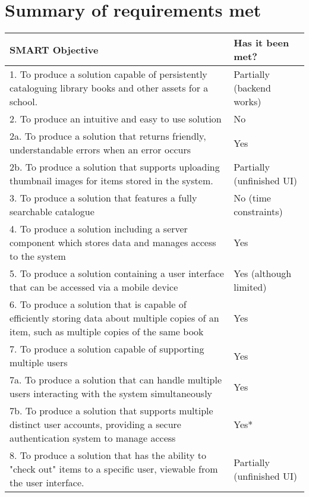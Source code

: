 \documentclass[../main.tex]{subfiles}
\begin{document}
\section{Summary of requirements met}

\begin{longtable}{ | >{\raggedright}p{} | >{\raggedright\arraybackslash}p{} | }
    \hline
    \textbf{SMART Objective}                                      & \textbf{Has it been met?} \\
    \hline
    1. To produce a solution capable of persistently
    cataloguing library books and other assets for a school.
                                                                  & Partially (backend works) \\
    \hline
    2. To produce an intuitive and easy to use solution
                                                                  & No                        \\
    \hline
    2a. To produce a solution that returns friendly, understandable errors when
    an error occurs                                               & Yes                       \\
    \hline
    2b. To produce a solution that supports uploading thumbnail images for items
    stored in the system.                                         & Partially (unfinished UI) \\
    \hline
    3. To produce a solution that features a fully searchable catalogue
                                                                  & No (time constraints)     \\
    \hline
    4. To produce a solution including a server component which stores data and
    manages access to the system                                  & Yes                       \\
    \hline
    5. To produce a solution containing a user interface that can be accessed via a
    mobile device                                                 & Yes (although limited)    \\
    \hline
    6. To produce a solution that is capable of efficiently storing data about multiple
    copies of an item, such as multiple copies of the same book   & Yes                       \\
    \hline
    7. To produce a solution capable of supporting multiple users & Yes                       \\
    \hline
    7a. To produce a solution that can handle multiple users interacting with the
    system simultaneously                                         & Yes                       \\
    \hline
    7b. To produce a solution that supports multiple distinct user accounts,
    providing a secure authentication system to manage access     & Yes*                      \\
    \hline
    8. To produce a solution that has the ability to "check out" items to a specific user,
    viewable from the user interface.                             & Partially (unfinished UI) \\
    \hline
\end{longtable}
\end{document}
